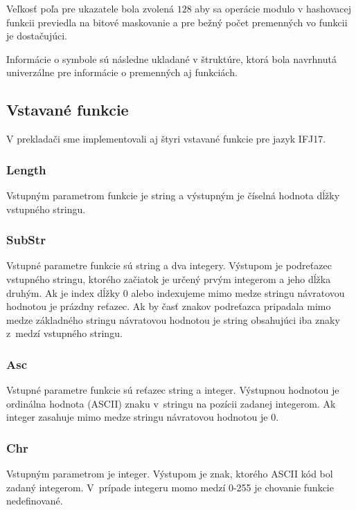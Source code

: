 \documentclass{article}
\begin{document}
            Veľkosť poľa pre ukazatele bola zvolená $128$ aby sa operácie modulo v hashovacej funkcii previedla na bitové maskovanie a pre bežný počet premenných vo funkcii je dostačujúci.
            
            Informácie o symbole sú následne ukladané v štruktúre, ktorá bola navrhnutá univerzálne pre informácie o premenných aj funkciách.
        
        \subsection{Vstavané funkcie}
            V prekladači sme implementovali aj štyri vstavané funkcie pre jazyk IFJ17.
            
            \subsubsection{Length}
            Vstupným parametrom funkcie je string a výstupným je číselná hodnota dĺžky vstupného stringu.
            
            \subsubsection{SubStr}
            Vstupné parametre funkcie sú string  a dva integery. Výstupom je podreťazec vstupného
            stringu, ktorého začiatok je určený prvým integerom a jeho dĺžka druhým. Ak je index dĺžky
            0 alebo indexujeme mimo medze stringu návratovou hodnotou je prázdny reťazec. Ak by časť 
            znakov podreťazca pripadala mimo medze základného stringu návratovou hodnotou je string
            obsahujúci iba znaky z~medzí vstupného stringu.
            
            \subsubsection{Asc}
            Vstupné parametre funkcie sú reťazec string a integer. Výstupnou hodnotou je ordinálna
            hodnota (ASCII) znaku v~stringu na pozícii zadanej integerom. Ak integer zasahuje mimo 
            medze stringu návratovou hodnotou je 0.
            
            \subsubsection{Chr}
            Vstupným parametrom je integer. Výstupom je znak, ktorého ASCII kód bol zadaný integerom.
            V~prípade integeru momo medzí 0-255 je chovanie funkcie nedefinované.
            
\end{document}
